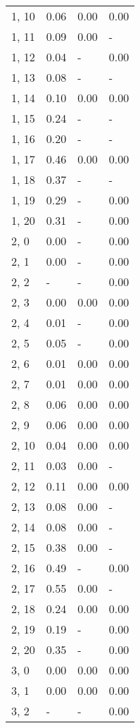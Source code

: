 \begin{table}
\begin{tabular}{llll}
1, 10  &    0.06 &  0.00 &  0.00 \\
1, 11  &    0.09 &  0.00 &     - \\
1, 12  &    0.04 &     - &  0.00 \\
1, 13  &    0.08 &     - &     - \\
1, 14  &    0.10 &  0.00 &  0.00 \\
1, 15  &    0.24 &     - &     - \\
1, 16  &    0.20 &     - &     - \\
1, 17  &    0.46 &  0.00 &  0.00 \\
1, 18  &    0.37 &     - &     - \\
1, 19  &    0.29 &     - &  0.00 \\
1, 20  &    0.31 &     - &  0.00 \\
2, 0   &    0.00 &     - &  0.00 \\
2, 1   &    0.00 &     - &  0.00 \\
2, 2   &       - &     - &  0.00 \\
2, 3   &    0.00 &  0.00 &  0.00 \\
2, 4   &    0.01 &     - &  0.00 \\
2, 5   &    0.05 &     - &  0.00 \\
2, 6   &    0.01 &  0.00 &  0.00 \\
2, 7   &    0.01 &  0.00 &  0.00 \\
2, 8   &    0.06 &  0.00 &  0.00 \\
2, 9   &    0.06 &  0.00 &  0.00 \\
2, 10  &    0.04 &  0.00 &  0.00 \\
2, 11  &    0.03 &  0.00 &     - \\
2, 12  &    0.11 &  0.00 &  0.00 \\
2, 13  &    0.08 &  0.00 &     - \\
2, 14  &    0.08 &  0.00 &     - \\
2, 15  &    0.38 &  0.00 &     - \\
2, 16  &    0.49 &     - &  0.00 \\
2, 17  &    0.55 &  0.00 &     - \\
2, 18  &    0.24 &  0.00 &  0.00 \\
2, 19  &    0.19 &     - &  0.00 \\
2, 20  &    0.35 &     - &  0.00 \\
3, 0   &    0.00 &  0.00 &  0.00 \\
3, 1   &    0.00 &  0.00 &  0.00 \\
3, 2   &       - &     - &  0.00 \\

\end{tabular}
\end{table}
